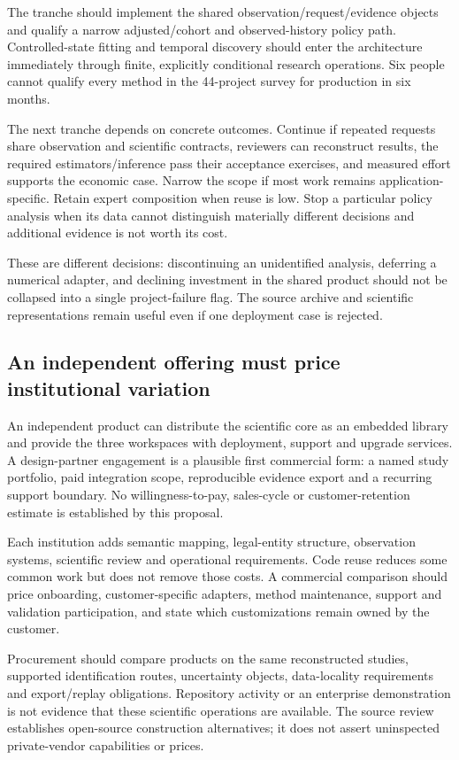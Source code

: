 The tranche should implement the shared observation/request/evidence
objects and qualify a narrow adjusted/cohort and observed-history
policy path. Controlled-state fitting and temporal discovery should
enter the architecture immediately through finite, explicitly conditional
research operations. Six people cannot qualify every method in the
44-project survey for production in six months.

The next tranche depends on concrete outcomes. Continue if repeated
requests share observation and scientific contracts, reviewers can
reconstruct results, the required estimators/inference pass their
acceptance exercises, and measured effort supports the economic case.
Narrow the scope if most work remains application-specific. Retain
expert composition when reuse is low. Stop a particular policy analysis
when its data cannot distinguish materially different decisions and
additional evidence is not worth its cost.

These are different decisions: discontinuing an unidentified analysis,
deferring a numerical adapter, and declining investment in the shared
product should not be collapsed into a single project-failure flag.
The source archive and scientific representations remain useful even
if one deployment case is rejected.

\subsection{An independent offering must price institutional variation}
\label{r3:commercial-product}

An independent product can distribute the scientific core as an embedded
library and provide the three workspaces with deployment, support and
upgrade services. A design-partner engagement is a plausible first
commercial form: a named study portfolio, paid integration scope,
reproducible evidence export and a recurring support boundary.
No willingness-to-pay, sales-cycle or customer-retention estimate is
established by this proposal.

Each institution adds semantic mapping, legal-entity structure, observation
systems, scientific review and operational requirements. Code reuse
reduces some common work but does not remove those costs. A commercial
comparison should price onboarding, customer-specific adapters, method
maintenance, support and validation participation, and state which
customizations remain owned by the customer.

Procurement should compare products on the same reconstructed studies,
supported identification routes, uncertainty objects, data-locality
requirements and export/replay obligations. Repository activity or an
enterprise demonstration is not evidence that these scientific
operations are available. The source review establishes open-source
construction alternatives; it does not assert uninspected private-vendor
capabilities or prices.

